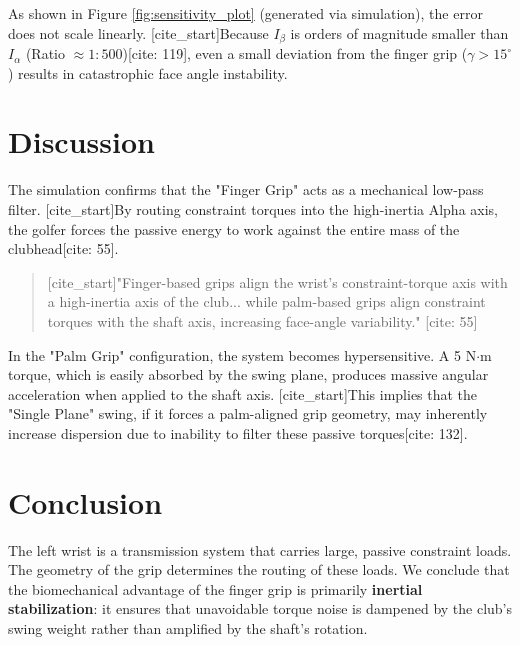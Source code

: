 \documentclass[11pt, letterpaper]{article}
\begin{document}
As shown in Figure \ref{fig:sensitivity_plot} (generated via simulation), the error does not scale linearly. [cite_start]Because $I_{\beta}$ is orders of magnitude smaller than $I_{\alpha}$ (Ratio $\approx 1:500$)[cite: 119], even a small deviation from the finger grip ($\gamma > 15^\circ$) results in catastrophic face angle instability.

\section{Discussion}

The simulation confirms that the "Finger Grip" acts as a mechanical low-pass filter. [cite_start]By routing constraint torques into the high-inertia Alpha axis, the golfer forces the passive energy to work against the entire mass of the clubhead[cite: 55].

\begin{quote}
    [cite_start]"Finger-based grips align the wrist’s constraint-torque axis with a high-inertia axis of the club... while palm-based grips align constraint torques with the shaft axis, increasing face-angle variability." [cite: 55]
\end{quote}

In the "Palm Grip" configuration, the system becomes hypersensitive. A 5 N$\cdot$m torque, which is easily absorbed by the swing plane, produces massive angular acceleration when applied to the shaft axis. [cite_start]This implies that the "Single Plane" swing, if it forces a palm-aligned grip geometry, may inherently increase dispersion due to inability to filter these passive torques[cite: 132].

\section{Conclusion}
The left wrist is a transmission system that carries large, passive constraint loads. The geometry of the grip determines the routing of these loads. We conclude that the biomechanical advantage of the finger grip is primarily \textbf{inertial stabilization}: it ensures that unavoidable torque noise is dampened by the club's swing weight rather than amplified by the shaft's rotation.
\end{document}
